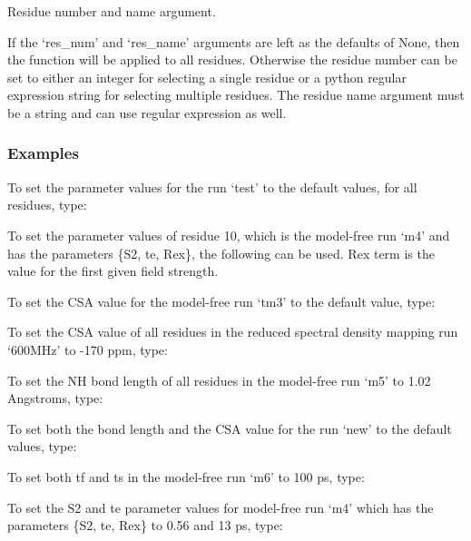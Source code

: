 Residue number and name argument.

If the `res\_num' and `res\_name' arguments are left as the defaults of None, then the
function will be applied to all residues.  Otherwise the residue number can be set to either
an integer for selecting a single residue or a python regular expression string for
selecting multiple residues.  The residue name argument must be a string and can use regular
expression as well.


\subsubsection{Examples}

To set the parameter values for the run `test' to the default values, for all residues,
type:


To set the parameter values of residue 10, which is the model-free run `m4' and has the
parameters \{S2, te, Rex\}, the following can be used.  Rex term is the value for the first
given field strength.



To set the CSA value for the model-free run `tm3' to the default value, type:


To set the CSA value of all residues in the reduced spectral density mapping run `600MHz' to
-170 ppm, type:



To set the NH bond length of all residues in the model-free run `m5' to 1.02 Angstroms,
type:



To set both the bond length and the CSA value for the run `new' to the default values, type:


To set both tf and ts in the model-free run `m6' to 100 ps, type:



To set the S2 and te parameter values for model-free run `m4' which has the parameters
\{S2, te, Rex\} to 0.56 and 13 ps, type:

